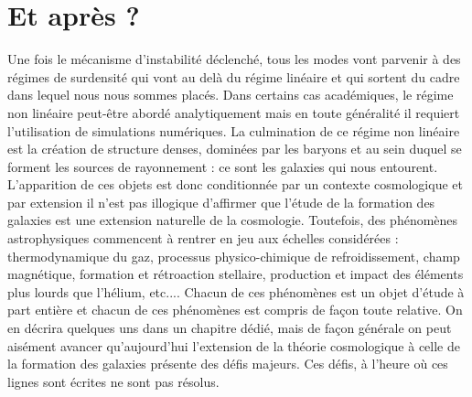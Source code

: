 \section{Et après ?}

Une fois le mécanisme d'instabilité déclenché, tous les modes vont parvenir à des régimes de surdensité qui vont au delà du régime linéaire et qui sortent du cadre dans lequel nous nous sommes placés. Dans certains cas académiques, le régime non linéaire peut-être abordé analytiquement mais en toute généralité il requiert l'utilisation de simulations numériques. La culmination de ce régime non linéaire est la création de structure denses, dominées par les baryons et au sein duquel se forment les sources de rayonnement : ce sont les galaxies qui nous entourent. L'apparition de ces objets est donc conditionnée par un contexte cosmologique et par extension il n'est pas illogique d'affirmer que l'étude de la formation des galaxies est une extension naturelle de la cosmologie. Toutefois, des phénomènes astrophysiques commencent à rentrer en jeu aux échelles considérées : thermodynamique du gaz, processus physico-chimique de refroidissement, champ magnétique, formation et rétroaction stellaire, production et impact des éléments plus lourds que l'hélium, etc.... Chacun de ces phénomènes est un objet d'étude à part entière et chacun de ces phénomènes est compris de façon toute relative. On en décrira quelques uns dans un chapitre dédié, mais de façon générale on peut aisément avancer qu'aujourd'hui l'extension de la théorie cosmologique à celle de la formation des galaxies présente des défis majeurs. Ces défis, à l'heure où ces lignes sont écrites ne sont pas résolus.
